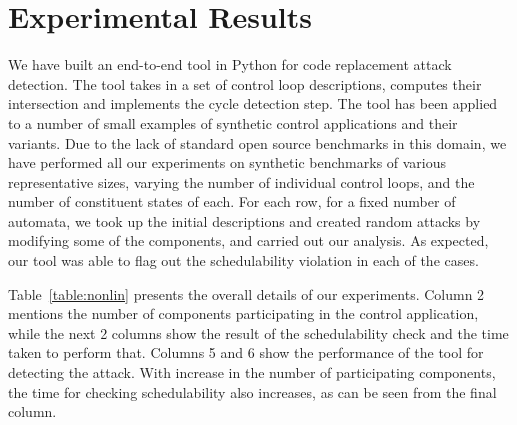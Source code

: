 \section{Experimental Results} \label{sec5}
\noindent
We have built an end-to-end tool in Python for code replacement attack detection.
The tool takes in a set of control loop descriptions, computes their intersection and 
implements the cycle detection step. The tool has been applied to a number of small 
examples of synthetic control applications and their variants. Due to the lack of standard open
source benchmarks in this domain, we have performed all our experiments on synthetic benchmarks of 
various representative sizes, varying the number of individual control loops, and the number of constituent states of each.
For each row, for a fixed number of automata, we took up the initial descriptions and created random attacks by modifying some of the components,
and carried out our analysis. As expected, our tool was able to flag out the
schedulability violation in each of the cases. 

Table~\ref{table:nonlin} presents the overall details of our experiments. 
Column 2 mentions the number of components participating in the control application, 
while the next 2 columns show the result of the schedulability check and the time taken to perform that.
Columns 5 and 6 show the performance of the tool for detecting the attack. With increase in the number of  
participating components, the time for checking schedulability also increases, as can be seen from the final column.


